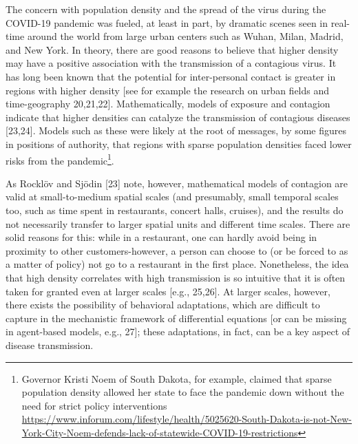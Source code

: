 \documentclass[10pt,letterpaper]{article}
\begin{document}
The concern with population density and the spread of the virus during
the COVID-19 pandemic was fueled, at least in part, by dramatic scenes
seen in real-time around the world from large urban centers such as
Wuhan, Milan, Madrid, and New York. In theory, there are good reasons to
believe that higher density may have a positive association with the
transmission of a contagious virus. It has long been known that the
potential for inter-personal contact is greater in regions with higher
density {[}see for example the research on urban fields and
time-geography 20,21,22{]}. Mathematically, models of exposure and
contagion indicate that higher densities can catalyze the transmission
of contagious diseases {[}23,24{]}. Models such as these were likely at
the root of messages, by some figures in positions of authority, that
regions with sparse population densities faced lower risks from the
pandemic\footnote{Governor Kristi Noem of South Dakota, for example,
  claimed that sparse population density allowed her state to face the
  pandemic down without the need for strict policy interventions
  \url{https://www.inforum.com/lifestyle/health/5025620-South-Dakota-is-not-New-York-City-Noem-defends-lack-of-statewide-COVID-19-restrictions}}.

As Rocklöv and Sjödin {[}23{]} note, however, mathematical models of
contagion are valid at small-to-medium spatial scales (and presumably,
small temporal scales too, such as time spent in restaurants, concert
halls, cruises), and the results do not necessarily transfer to larger
spatial units and different time scales. There are solid reasons for
this: while in a restaurant, one can hardly avoid being in proximity to
other customers-however, a person can choose to (or be forced to as a
matter of policy) not go to a restaurant in the first place.
Nonetheless, the idea that high density correlates with high
transmission is so intuitive that it is often taken for granted even at
larger scales {[}e.g., 25,26{]}. At larger scales, however, there exists
the possibility of behavioral adaptations, which are difficult to
capture in the mechanistic framework of differential equations {[}or can
be missing in agent-based models, e.g., 27{]}; these adaptations, in
fact, can be a key aspect of disease transmission.
\end{document}
